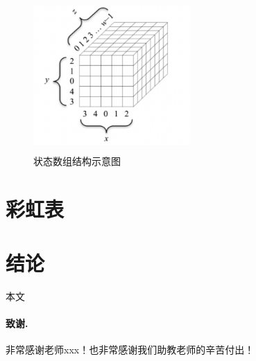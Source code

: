 \documentclass[onecolumn]{article}
\begin{document}
 \begin{figure}[]
  \centering
  \includegraphics[width=6cm,height=5.8cm]{figures/xyz.png}
  \caption{状态数组结构示意图}
 \label{fig:xyz}
 \end{figure}




 

\section{彩虹表}\label{sec:partthree}

\section{结论}\label{sec:Conclusion}

本文


{


}


\paragraph{致谢.} 非常感谢老师xxx！也非常感谢我们助教老师的辛苦付出！



\end{document}
